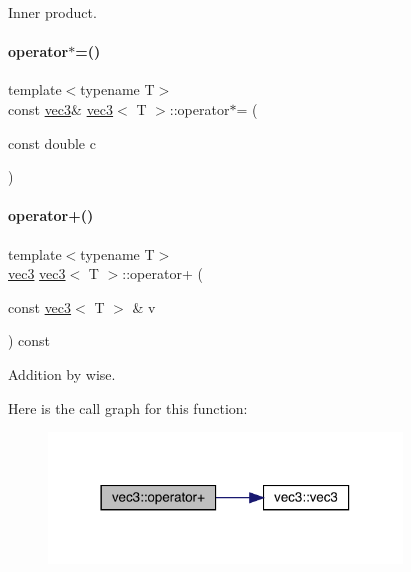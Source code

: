 Inner product. 

\mbox{\label{structvec3_a401db8071cae874abdd0bc04846ee27f}} 
\paragraph{\texorpdfstring{operator$\ast$=()}{operator*=()}}
{\footnotesize\ttfamily template$<$typename T$>$ \\
const \mbox{\hyperlink{structvec3}{vec3}}\& \mbox{\hyperlink{structvec3}{vec3}}$<$ T $>$\+::operator$\ast$= (\begin{DoxyParamCaption}\item[{const double}]{c }\end{DoxyParamCaption})\hspace{0.3cm}{\ttfamily [inline]}}

\mbox{\label{structvec3_a255037f59863e54390e388dd07e7ee8f}} 
\paragraph{\texorpdfstring{operator+()}{operator+()}\hspace{0.1cm}{\footnotesize\ttfamily [1/2]}}
{\footnotesize\ttfamily template$<$typename T$>$ \\
\mbox{\hyperlink{structvec3}{vec3}} \mbox{\hyperlink{structvec3}{vec3}}$<$ T $>$\+::operator+ (\begin{DoxyParamCaption}\item[{const \mbox{\hyperlink{structvec3}{vec3}}$<$ T $>$ \&}]{v }\end{DoxyParamCaption}) const\hspace{0.3cm}{\ttfamily [inline]}}



Addition by wise. 

Here is the call graph for this function\+:\nopagebreak
\begin{figure}[H]
\begin{center}
\leavevmode
\includegraphics[width=266pt]{structvec3_a255037f59863e54390e388dd07e7ee8f_cgraph}
\end{center}
\end{figure}
\mbox{\label{structvec3_a479dd2445daeeec47e6a5a8e4487f51b}} 
